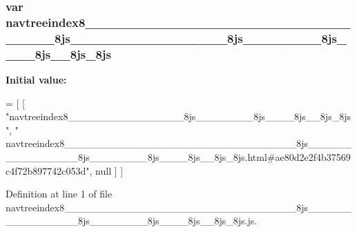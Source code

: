 \subsubsection[{navtreeindex8\+\_\+\+\_\+\+\_\+\+\_\+\+\_\+\+\_\+\+\_\+\+\_\+\+\_\+\+\_\+\+\_\+\+\_\+\+\_\+\+\_\+\+\_\+\+\_\+\+\_\+\+\_\+\+\_\+\+\_\+\+\_\+\+\_\+\+\_\+\+\_\+\+\_\+\+\_\+\+\_\+\+\_\+\+\_\+\+\_\+\+\_\+\+\_\+8js\+\_\+\+\_\+\+\_\+\+\_\+\+\_\+\+\_\+\+\_\+\+\_\+\+\_\+\+\_\+\+\_\+\+\_\+\+\_\+\+\_\+\+\_\+\+\_\+8js\+\_\+\+\_\+\+\_\+\+\_\+\+\_\+\+\_\+\+\_\+\+\_\+8js\+\_\+\+\_\+\+\_\+\+\_\+8js\+\_\+\+\_\+8js\+\_\+8js}]{\setlength{\rightskip}{0pt plus 5cm}var navtreeindex8\+\_\+\+\_\+\+\_\+\+\_\+\+\_\+\+\_\+\+\_\+\+\_\+\+\_\+\+\_\+\+\_\+\+\_\+\+\_\+\+\_\+\+\_\+\+\_\+\+\_\+\+\_\+\+\_\+\+\_\+\+\_\+\+\_\+\+\_\+\+\_\+\+\_\+\+\_\+\+\_\+\+\_\+\+\_\+\+\_\+\+\_\+\+\_\+8js\+\_\+\+\_\+\+\_\+\+\_\+\+\_\+\+\_\+\+\_\+\+\_\+\+\_\+\+\_\+\+\_\+\+\_\+\+\_\+\+\_\+\+\_\+\+\_\+8js\+\_\+\+\_\+\+\_\+\+\_\+\+\_\+\+\_\+\+\_\+\+\_\+8js\+\_\+\+\_\+\+\_\+\+\_\+8js\+\_\+\+\_\+8js\+\_\+8js}\label{navtreeindex8________________________________________________________________8js________________4a97fc55015bfba9892d33dd12a5e421_ae09da4878e4e470b80acea0eccc855da}
{\bfseries Initial value\+:}
\begin{DoxyCode}
=
[
    [ \textcolor{stringliteral}{"navtreeindex8\_\_\_\_\_\_\_\_\_\_\_\_\_\_\_\_8js\_\_\_\_\_\_\_\_8js\_\_\_\_8js\_\_8js\_8js"}, \textcolor{stringliteral}{"
      navtreeindex8\_\_\_\_\_\_\_\_\_\_\_\_\_\_\_\_\_\_\_\_\_\_\_\_\_\_\_\_\_\_\_\_8js\_\_\_\_\_\_\_\_\_\_\_\_\_\_\_\_8js\_\_\_\_\_\_\_\_8js\_\_\_\_8js\_\_8js\_8js.html#ae80d2e2f4b37569c4f72b897742c053d"}, null ]
]
\end{DoxyCode}


Definition at line 1 of file navtreeindex8\+\_\+\+\_\+\+\_\+\+\_\+\+\_\+\+\_\+\+\_\+\+\_\+\+\_\+\+\_\+\+\_\+\+\_\+\+\_\+\+\_\+\+\_\+\+\_\+\+\_\+\+\_\+\+\_\+\+\_\+\+\_\+\+\_\+\+\_\+\+\_\+\+\_\+\+\_\+\+\_\+\+\_\+\+\_\+\+\_\+\+\_\+\+\_\+8js\+\_\+\+\_\+\+\_\+\+\_\+\+\_\+\+\_\+\+\_\+\+\_\+\+\_\+\+\_\+\+\_\+\+\_\+\+\_\+\+\_\+\+\_\+\+\_\+8js\+\_\+\+\_\+\+\_\+\+\_\+\+\_\+\+\_\+\+\_\+\+\_\+8js\+\_\+\+\_\+\+\_\+\+\_\+8js\+\_\+\+\_\+8js\+\_\+8js.\+js.

